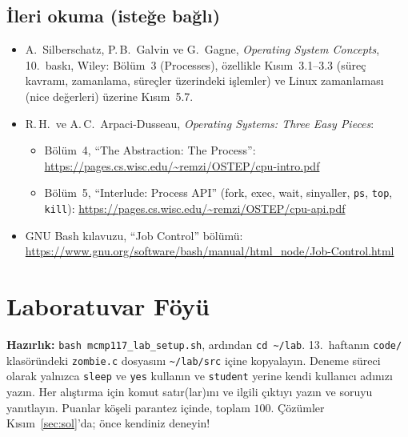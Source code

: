 \documentclass[11pt,a4paper]{article}
\newcommand{\cmd}[1]{\texttt{#1}}
\begin{document}
\subsection*{İleri okuma (isteğe bağlı)}
\begin{itemize}
  \item A.\ Silberschatz, P.\,B.\ Galvin ve G.\ Gagne, \emph{Operating System Concepts}, 10.\ baskı, Wiley: Bölüm~3 (Processes), özellikle Kısım~3.1--3.3 (süreç kavramı, zamanlama, süreçler üzerindeki işlemler) ve Linux zamanlaması (nice değerleri) üzerine Kısım~5.7.
  \item R.\,H.\ ve A.\,C.\ Arpaci-Dusseau, \emph{Operating Systems: Three Easy Pieces}:
  \begin{itemize}
    \item Bölüm~4, ``The Abstraction: The Process'': \url{https://pages.cs.wisc.edu/~remzi/OSTEP/cpu-intro.pdf}
    \item Bölüm~5, ``Interlude: Process API'' (fork, exec, wait, sinyaller, \cmd{ps}, \cmd{top}, \cmd{kill}): \url{https://pages.cs.wisc.edu/~remzi/OSTEP/cpu-api.pdf}
  \end{itemize}
  \item GNU Bash kılavuzu, ``Job Control'' bölümü: \url{https://www.gnu.org/software/bash/manual/html_node/Job-Control.html}
\end{itemize}

\section{Laboratuvar Föyü}
\label{sec:lab}

\textbf{Hazırlık:} \cmd{bash mcmp117\_lab\_setup.sh}, ardından \cmd{cd \textasciitilde/lab}. 13.~haftanın \texttt{code/} klasöründeki \texttt{zombie.c} dosyasını \texttt{\textasciitilde/lab/src} içine kopyalayın. Deneme süreci olarak yalnızca \cmd{sleep} ve \cmd{yes} kullanın ve \texttt{student} yerine kendi kullanıcı adınızı yazın. Her alıştırma için komut satır(lar)ını ve ilgili çıktıyı yazın ve soruyu yanıtlayın. Puanlar köşeli parantez içinde, toplam $100$. Çözümler Kısım~\ref{sec:sol}'da; önce kendiniz deneyin!
\end{document}
